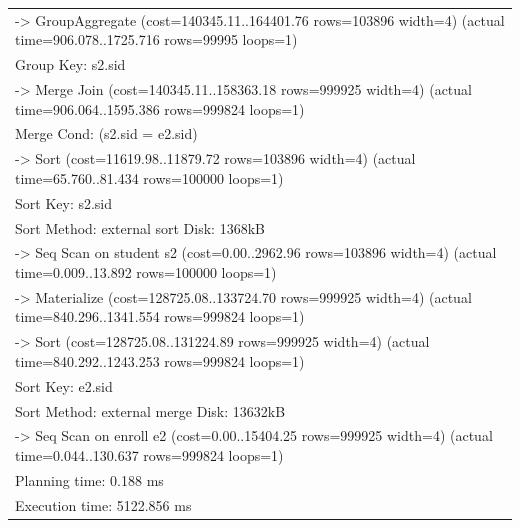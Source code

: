 \documentclass[10pt]{article}
\newlength{\mytab}
\begin{document}
\begin{enumerate}
\begin{itemize}
\begin{center}
{\begin{tabular}{l}
								\hspace{3\mytab} ->  GroupAggregate  (cost=140345.11..164401.76 rows=103896 width=4) (actual time=906.078..1725.716 rows=99995 loops=1)\\
								\hspace{5\mytab} Group Key: s2.sid\\
								\hspace{5\mytab} ->  Merge Join  (cost=140345.11..158363.18 rows=999925 width=4) (actual time=906.064..1595.386 rows=999824 loops=1)\\
								\hspace{6\mytab} Merge Cond: (s2.sid = e2.sid)\\
								\hspace{6\mytab} ->  Sort  (cost=11619.98..11879.72 rows=103896 width=4) (actual time=65.760..81.434 rows=100000 loops=1)\\
								\hspace{7\mytab} Sort Key: s2.sid\\
								\hspace{7\mytab} Sort Method: external sort  Disk: 1368kB\\
								\hspace{7\mytab} ->  Seq Scan on student s2  (cost=0.00..2962.96 rows=103896 width=4) (actual time=0.009..13.892 rows=100000 loops=1)\\
								\hspace{6\mytab} ->  Materialize  (cost=128725.08..133724.70 rows=999925 width=4) (actual time=840.296..1341.554 rows=999824 loops=1)\\
								\hspace{7\mytab} ->  Sort  (cost=128725.08..131224.89 rows=999925 width=4) (actual time=840.292..1243.253 rows=999824 loops=1)\\
								\hspace{8\mytab} Sort Key: e2.sid\\
								\hspace{8\mytab} Sort Method: external merge  Disk: 13632kB\\
								\hspace{8\mytab} ->  Seq Scan on enroll e2  (cost=0.00..15404.25 rows=999925 width=4) (actual time=0.044..130.637 rows=999824 loops=1)\\
								\hspace{0\mytab} Planning time: 0.188 ms\\
								\hspace{0\mytab} Execution time: 5122.856 ms\\
							\end{tabular}
						}
					\end{center}
				

\end{itemize}
\end{enumerate}
\end{document}
